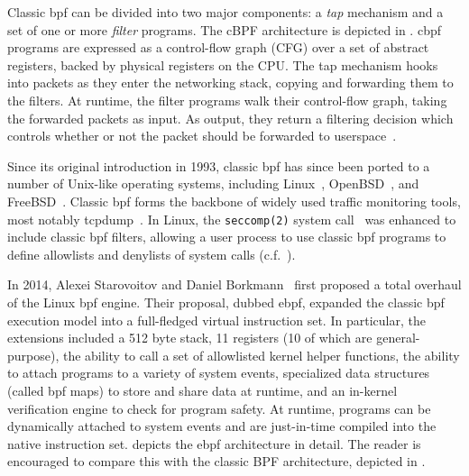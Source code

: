 Classic \gls{bpf} can be divided into two major components: a \textit{tap} mechanism and a set
of one or more \textit{filter} programs. The cBPF architecture is depicted in
. \gls{cbpf} programs are expressed as a control-flow graph (CFG)
over a set of abstract registers, backed by physical registers on the CPU. The tap
mechanism hooks into packets as they enter the networking stack, copying and forwarding
them to the filters. At runtime, the filter programs walk their control-flow graph, taking
the forwarded packets as input. As output, they return a filtering decision which controls
whether or not the packet should be forwarded to userspace~\cite{mccanne1993_bpf}.

Since its original introduction in 1993, classic \gls{bpf} has since been ported to
a number of Unix-like operating systems, including Linux~\cite{linux_bpf},
OpenBSD~\cite{openbsd_bpf}, and FreeBSD~\cite{freebsd_bpf}. Classic \gls{bpf} forms the
backbone of widely used traffic monitoring tools, most notably tcpdump~\cite{tcpdump,
mccanne1993_bpf}. In Linux, the \texttt{seccomp(2)} system
call~\cite{anderson2017_comparison} was enhanced to include classic \gls{bpf} filters,
allowing a user process to use classic \gls{bpf} programs to define allowlists and
denylists of system calls (c.f.~).

In 2014, Alexei Starovoitov and Daniel Borkmann~\cite{starovoitov2014_ebpf} first proposed
a total overhaul of the Linux \gls{bpf} engine. Their proposal, dubbed \gls{ebpf}, expanded the
classic \gls{bpf} execution model into a full-fledged virtual instruction set. In particular,
the extensions included a 512 byte stack, 11 registers (10 of which are general-purpose),
the ability to call a set of allowlisted kernel helper functions, the ability to attach
programs to a variety of system events, specialized data structures (called \gls{bpf} maps) to
store and share data at runtime, and an in-kernel verification engine to check for program
safety. At runtime, programs can be dynamically attached to system events and are
just-in-time compiled into the native instruction set.   depicts
the \gls{ebpf} architecture in detail. The reader is encouraged to compare this with the classic
BPF architecture, depicted in .

